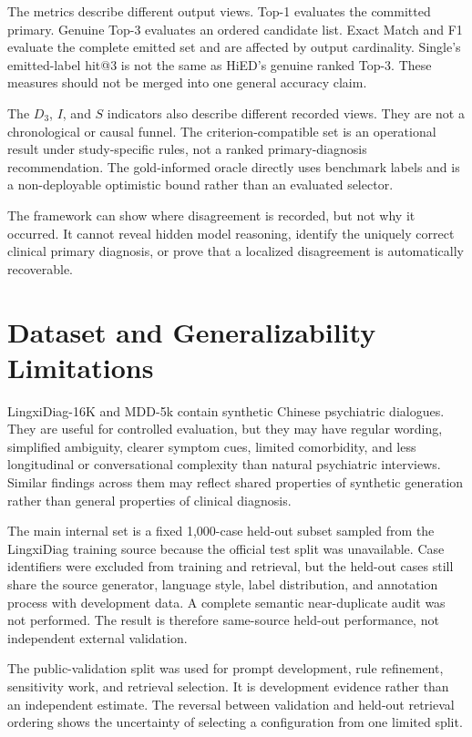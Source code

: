 The metrics describe different output views. Top-1 evaluates the committed primary. Genuine Top-3 evaluates an ordered candidate list. Exact Match and F1 evaluate the complete emitted set and are affected by output cardinality. Single's emitted-label hit@3 is not the same as HiED's genuine ranked Top-3. These measures should not be merged into one general accuracy claim.

The $D_3$, $I$, and $S$ indicators also describe different recorded views. They are not a chronological or causal funnel. The criterion-compatible set is an operational result under study-specific rules, not a ranked primary-diagnosis recommendation. The gold-informed oracle directly uses benchmark labels and is a non-deployable optimistic bound rather than an evaluated selector.

The framework can show where disagreement is recorded, but not why it occurred. It cannot reveal hidden model reasoning, identify the uniquely correct clinical primary diagnosis, or prove that a localized disagreement is automatically recoverable.

\section{Dataset and Generalizability Limitations}

LingxiDiag-16K and MDD-5k contain synthetic Chinese psychiatric dialogues. They are useful for controlled evaluation, but they may have regular wording, simplified ambiguity, clearer symptom cues, limited comorbidity, and less longitudinal or conversational complexity than natural psychiatric interviews. Similar findings across them may reflect shared properties of synthetic generation rather than general properties of clinical diagnosis.

The main internal set is a fixed 1,000-case held-out subset sampled from the LingxiDiag training source because the official test split was unavailable. Case identifiers were excluded from training and retrieval, but the held-out cases still share the source generator, language style, label distribution, and annotation process with development data. A complete semantic near-duplicate audit was not performed. The result is therefore same-source held-out performance, not independent external validation.

The public-validation split was used for prompt development, rule refinement, sensitivity work, and retrieval selection. It is development evidence rather than an independent estimate. The reversal between validation and held-out retrieval ordering shows the uncertainty of selecting a configuration from one limited split.

